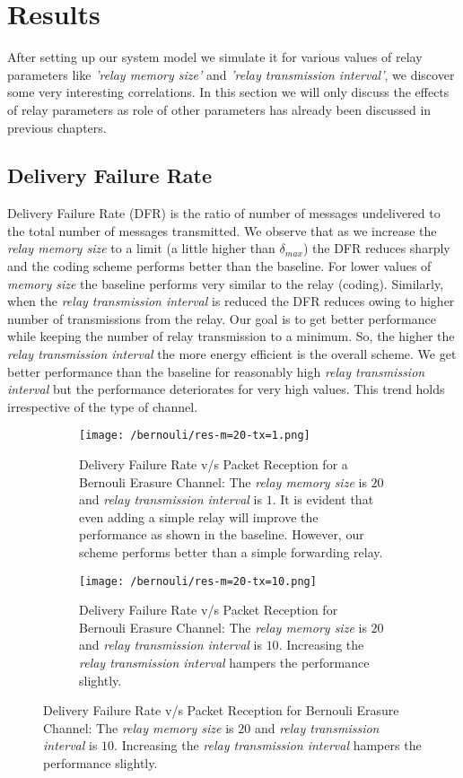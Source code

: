 \section{Results}

After setting up our system model we simulate it for various values of relay parameters like \textit{'relay memory size'} and \textit{'relay transmission interval'}, we discover some very interesting correlations. In this section we will only discuss the effects of relay parameters as role of other parameters has already been discussed in previous chapters.

\subsection{Delivery Failure Rate}
Delivery Failure Rate (DFR) is the ratio of number of messages undelivered to the total number of messages transmitted. We observe that as we increase the \textit{relay memory size} to a limit (a little higher than $\delta_{max}$) the DFR reduces sharply and the coding scheme performs better than the baseline. For lower values of \textit{memory size} the baseline performs very similar to the relay (coding). Similarly, when the \textit{relay transmission interval} is reduced the DFR reduces owing to higher number of transmissions from the relay. Our goal is to get better performance while keeping the number of relay transmission to a minimum. So, the higher the \textit{relay transmission interval} the more energy efficient is the overall scheme. We get better performance than the baseline for reasonably high \textit{relay transmission interval} but the performance deteriorates for very high values. This trend holds irrespective of the type of channel.

\newpage
\begin{figure}[H]
	\centering
	\vspace{5ex}
	\begin{subfigure}
		\centering
		\texttt{[image: /bernouli/res-m=20-tx=1.png]}
		\caption{Delivery Failure Rate v/s Packet Reception for a Bernouli Erasure Channel: The \textit{relay memory size} is $20$ and \textit{relay transmission interval} is $1$. It is evident that even adding a simple relay will improve the performance as shown in the baseline. However, our scheme performs better than a simple forwarding relay.}
		\label{relay-res-1}
	\end{subfigure}

	\vspace{5ex}

	\begin{subfigure}
		\centering
		\texttt{[image: /bernouli/res-m=20-tx=10.png]}
		\caption{Delivery Failure Rate v/s Packet Reception for Bernouli Erasure Channel:  The \textit{relay memory size} is $20$ and \textit{relay transmission interval} is $10$. Increasing the \textit{relay transmission interval} hampers the performance slightly.}
		\label{relay-res-2}
	\end{subfigure}
\end{figure}

